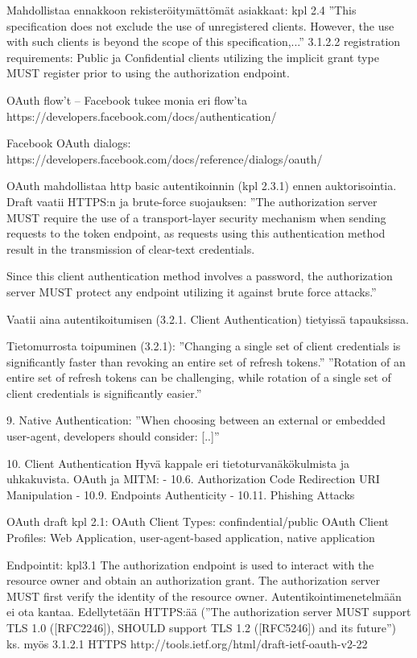 \documentclass[finnish,gradu]{tktltiki}
\begin{document}
  Mahdollistaa ennakkoon rekisteröitymättömät asiakkaat: kpl 2.4 ''This specification does not exclude the use of unregistered clients. However, the use with
  such clients is beyond the scope of this specification,...''
  3.1.2.2 registration requirements:
    Public ja Confidential clients utilizing the implicit grant type MUST register prior to using the authorization endpoint.

  OAuth flow't -- Facebook tukee monia eri flow'ta https://developers.facebook.com/docs/authentication/

  Facebook OAuth dialogs: https://developers.facebook.com/docs/reference/dialogs/oauth/

  OAuth mahdollistaa http basic autentikoinnin (kpl 2.3.1) ennen auktorisointia.
  Draft vaatii HTTPS:n ja brute-force suojauksen:
    ''The authorization server MUST require the use of a transport-layer
     security mechanism when sending requests to the token endpoint, as
     requests using this authentication method result in the transmission
     of clear-text credentials.

     Since this client authentication method involves a password, the
     authorization server MUST protect any endpoint utilizing it against
     brute force attacks.''

  Vaatii aina autentikoitumisen (3.2.1. Client Authentication) tietyissä tapauksissa.

  Tietomurrosta toipuminen (3.2.1):
  ''Changing a single set of client credentials is significantly faster than revoking an entire set of refresh tokens.''
  ''Rotation of an entire set of refresh tokens can be challenging, while rotation of a single set of client credentials is significantly easier.''

  9. Native Authentication:
  ''When choosing between an external or embedded user-agent, developers should consider: [..]''

  10. Client Authentication
  Hyvä kappale eri tietoturvanäkökulmista ja uhkakuvista.
  OAuth ja MITM:
  - 10.6.  Authorization Code Redirection URI Manipulation
  - 10.9.  Endpoints Authenticity
  - 10.11.  Phishing Attacks


  OAuth draft kpl 2.1:
  OAuth Client Types: confindential/public
  OAuth Client Profiles: Web Application, user-agent-based application, native application

  Endpointit: kpl3.1
   The authorization endpoint is used to interact with the resource
      owner and obtain an authorization grant.  The authorization server
      MUST first verify the identity of the resource owner.
   Autentikointimenetelmään ei ota kantaa.
   Edellytetään HTTPS:ää (''The authorization server MUST support TLS 1.0 ([RFC2246]), SHOULD support TLS 1.2 ([RFC5246]) and its future'')
   ks. myös 3.1.2.1 HTTPS
  http://tools.ietf.org/html/draft-ietf-oauth-v2-22
\end{document}
